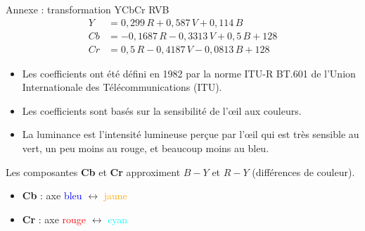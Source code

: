 \documentclass[xcolor=dvipsnames]{beamer}
\begin{document}
\begin{frame} {Annexe : transformation YCbCr RVB}
    \scriptsize
    \begin{align*}
        Y &= 0,299 \, R + 0,587 \, V + 0,114 \, B \\
        Cb &= -0,1687 \, R - 0,3313 \, V + 0,5 \, B + 128 \\
        Cr &= 0,5 \, R - 0,4187 \, V - 0,0813 \, B + 128
    \end{align*}
    
    \vspace{0.4cm}

    \footnotesize
    \begin{itemize}
        \item Les coefficients ont été défini en 1982 par la norme ITU-R BT.601 de l'Union Internationale des Télécommunications (ITU).
        \item Les coefficients sont basés sur la sensibilité de l'œil aux couleurs.
        \item La luminance est l'intensité lumineuse perçue par l'œil qui est très sensible au vert, un peu moins au rouge, et beaucoup moins au bleu.
    \end{itemize}

    
    \vspace{0.7cm}
    
    Les composantes \textbf{Cb} et \textbf{Cr} approximent $B - Y$ et $R - Y$ (différences de couleur).
    
    \begin{itemize}
        \item \textbf{Cb} : axe \textcolor{blue}{bleu} $\leftrightarrow$ \textcolor{orange}{jaune}
        \item \textbf{Cr} : axe \textcolor{red}{rouge} $\leftrightarrow$ \textcolor{cyan}{cyan}
    \end{itemize}
    
    \vspace{0.4cm}
\end{frame}
\end{document}
